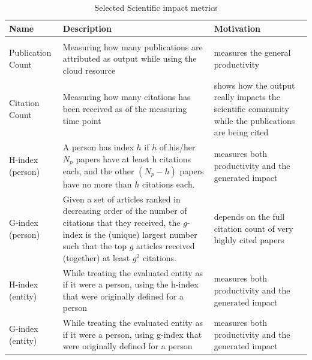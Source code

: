 \documentclass{sig-alternate-05-2015}
\begin{document}
\begin{table}[htb]
\caption{Selected Scientific impact metrics}
\begin{scriptsize}
\label{T:SIMmetrics}
\bigskip
\begin{center}
\begin{tabular}{p{}p{}p{}}
Name & Description & Motivation \\
\hline
\rowcolor{blue!20} \multicolumn{3}{l}{\bf Scientific impact metrics} \\
\hline
Publication Count &
Measuring how many publications are attributed as output while using the cloud 
resource &
measures the general productivity \\
\hline 
Citation Count &
Measuring how many citations has been received as of the measuring time point &
shows how the output really impacts the scientific community while the 
publications are being cited \\
\hline
H-index (person) \cite{??} &
A person has index $h$ if $h$ of his/her $N_p$ papers have at least h
                   citations each, and the other $(N_p − h)$ papers have
                   no more than $h$ citations each. &
 measures both productivity and the generated impact \\
\hline
G-index (person) \cite{??} &
Given a set of articles ranked in decreasing order of the number of citations that they received, the $g$-index is the (unique) largest number such that the top $g$ articles received (together) at least $g^2$ citations.&
depends on the full citation count of very highly cited papers\\
\hline
H-index (entity) &
While treating the evaluated entity as if it were a person, using the
h-index that were originally defined for a person &
measures both productivity and the generated impact \\
\hline
G-index (entity)&
While treating the evaluated entity as if it were a person, using 
g-index that were originally defined for a person &
measures both productivity and the generated impact \\
\hline
\end{tabular}
\end{center}
\end{scriptsize}
\end{table}
\end{document}
